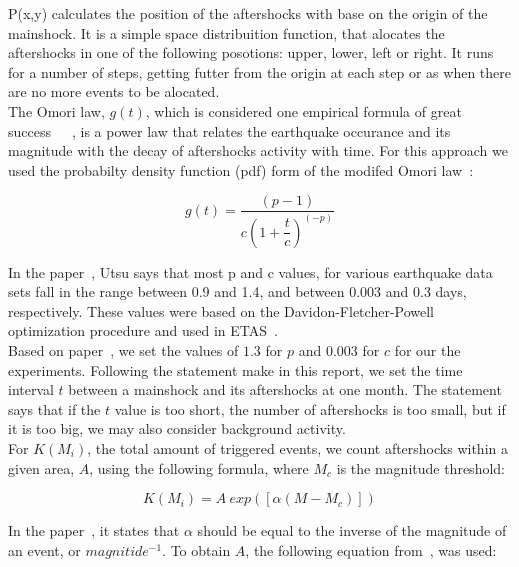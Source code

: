 P(x,y) calculates the position of the aftershocks with base on the origin of the mainshock. It is a simple space distribuition function, that alocates the aftershocks in one of the following posotions: upper, lower, left or right. It runs for a number of steps, getting futter from the origin at each step or as when there are no more events to be alocated.\\

The Omori law, $g(t)$, which is considered one empirical formula of great success~\cite{zhuang2004analyzing}~\cite{utsu1995centenary}~\cite{omori1895after}, is a power law that relates the earthquake occurance and its magnitude
with the decay of aftershocks activity with time. For this approach we used the probabilty density function (pdf) form of the modifed Omori law~\cite{zhuang2004analyzing}:

\begin{equation}\label{omori}
	g(t)= \dfrac{(p-1)}{c(1+ \dfrac{t}{c})^(-p)}
\end{equation}

In the paper~\cite{utsu1995centenary}, Utsu says that most p and c
values, for various earthquake data sets fall in the range between 0.9
and 1.4, and between 0.003 and 0.3 days, respectively. These values
were based on the Davidon-Fletcher-Powell optimization procedure and
used in ETAS~\cite{utsu1995centenary}.\\

Based on paper~\cite{yamanaka1990scaling}, we set the values of $1.3$
for $p$ and $0.003$ for $c$ for our the experiments. Following the
statement make in this report, we set the time interval $t$ between a
mainshock and its aftershocks at one month. The statement says that if
the $t$ value is too short, the number of aftershocks is too small,
but if it is too big, we may also consider background activity.\\

For $K(M_i)$, the total amount of triggered events, we count
aftershocks within a given area, $A$, using the following formula,
where $M_c$ is the magnitude threshold:

\begin{equation}\label{triggered}
 K(M_i) = A\ exp([\alpha(M-M_c)])
\end{equation}

In the paper~\cite{ogata2006space}, it states that $\alpha$ should be
equal to the inverse of the magnitude of an event, or
$magnitide^{-1}$. To obtain $A$, the following equation
from~\cite{yamanaka1990scaling}, was used:

